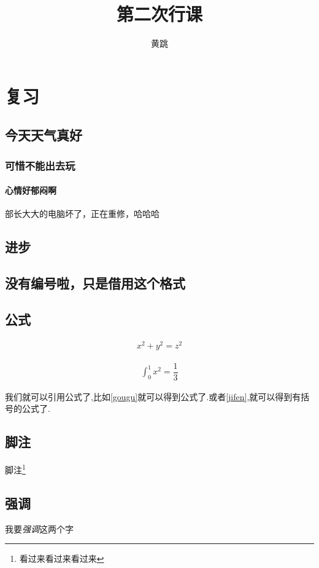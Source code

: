 \documentclass{ctexbook}
\begin{document}
	\frontmatter
	\tableofcontents
	\title{第二次行课}
	\author{黄跳}
	\maketitle
	\mainmatter
	\chapter{复习}
	\section{今天天气真好}
	\subsection{可惜不能出去玩}
	\subsubsection{心情好郁闷啊}
	
	部长大大的电脑坏了，正在重修，哈哈哈
	\section{进步}
	\section*{没有编号啦，只是借用这个格式}
	
	\section{公式}
	
	\begin{gather}
		\label{gougu}
		x^{2}+y^{2}=z^{2}
	\end{gather}
	
	\begin{gather}
	\label{jifen}
		\int_{0}^{1}x^{2}=\dfrac{1}{3}
	\end{gather}
	
	我们就可以引用公式了,比如\ref{gougu}就可以得到公式了.或者\eqref{jifen},就可以得到有括号的公式了.
	
	\section{ 脚注}
	脚注\footnote{看过来看过来看过来}
	
	\section{强调}
	我要\emph{强调}这两个字 
	
\end{document}
